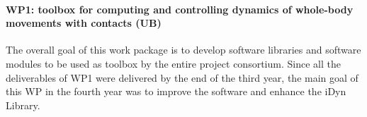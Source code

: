 \paragraph{WP1: toolbox for computing and controlling dynamics of whole-body movements with contacts (UB)}
The overall goal of this work package is to develop software libraries and
software modules to be used as toolbox by the entire project consortium.
Since all the deliverables of WP1 were delivered by the end of the third year,
the main goal of this WP in the fourth year was to improve the software and
enhance the iDyn Library.


 
